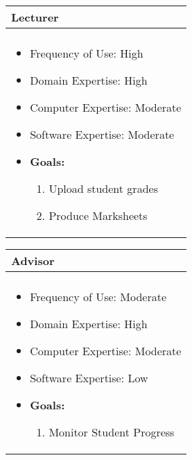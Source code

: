 \documentclass[11pt]{article}
\begin{document}
\begin{center}
\begin{tabular}{ | m{12cm} | } 
 \hline
 \textbf{Lecturer}   \\ 
  \hline
  \\[5pt]
\begin{itemize}
\item{Frequency of Use: High}
\item{Domain Expertise: High}
\item{Computer Expertise: Moderate}
\item{Software Expertise: Moderate}
\item{\textbf{Goals:}}
\begin{enumerate}
\item{Upload student grades}
\item{Produce Marksheets}
\end{enumerate}
\end{itemize} \\
 \hline
\end{tabular}
\end{center}

\begin{center}
\begin{tabular}{ | m{12cm} | } 
 \hline
 \textbf{Advisor}   \\ 
  \hline
  \\[5pt]
\begin{itemize}
\item{Frequency of Use: Moderate}
\item{Domain Expertise: High}
\item{Computer Expertise: Moderate}
\item{Software Expertise: Low}
\item{\textbf{Goals:}}
\begin{enumerate}
\item{Monitor Student Progress}
\end{enumerate}
\end{itemize} \\
 \hline
\end{tabular}
\end{center}
\end{document}
